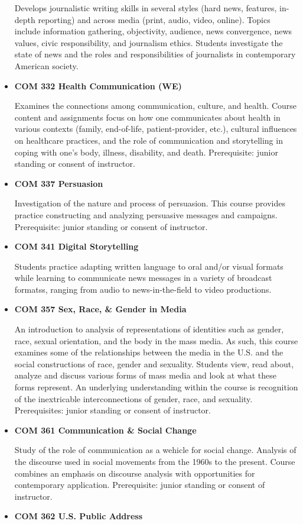 \documentclass[
  letterpaper,
]{scrbook}
\begin{document}
\begin{itemize}
  Develops journalistic writing skills in several styles (hard news,
  features, in-depth reporting) and across media (print, audio, video,
  online). Topics include information gathering, objectivity, audience,
  news convergence, news values, civic responsibility, and journalism
  ethics. Students investigate the state of news and the roles and
  responsibilities of journalists in contemporary American society.
\item
  \textbf{COM 332 Health Communication (WE)}

  Examines the connections among communication, culture, and health.
  Course content and assignments focus on how one communicates about
  health in various contexts (family, end-of-life, patient-provider,
  etc.), cultural influences on healthcare practices, and the role of
  communication and storytelling in coping with one's body, illness,
  disability, and death. Prerequisite: junior standing or consent of
  instructor.
\item
  \textbf{COM 337 Persuasion}

  Investigation of the nature and process of persuasion. This course
  provides practice constructing and analyzing persuasive messages and
  campaigns. Prerequisite: junior standing or consent of instructor.
\item
  \textbf{COM 341 Digital Storytelling}

  Students practice adapting written language to oral and/or visual
  formats while learning to communicate news messages in a variety of
  broadcast formatss, ranging from audio to news-in-the-field to video
  productions.
\item
  \textbf{COM 357 Sex, Race, \& Gender in Media}

  An introduction to analysis of representations of identities such as
  gender, race, sexual orientation, and the body in the mass media. As
  such, this course examines some of the relationships between the media
  in the U.S. and the social constructions of race, gender and
  sexuality. Students view, read about, analyze and discuss various
  forms of mass media and look at what these forms represent. An
  underlying understanding within the course is recognition of the
  inextricable interconnections of gender, race, and sexuality.
  Prerequisites: junior standing or consent of instructor.
\item
  \textbf{COM 361 Communication \& Social Change}

  Study of the role of communication as a wehicle for social change.
  Analysis of the discourse used in social movements from the 1960s to
  the present. Course combines an emphasis on discourse analysis with
  opportunities for contemporary application. Prerequisite: junior
  standing or consent of instructor.
\item
  \textbf{COM 362 U.S. Public Address}


\end{itemize}
\end{document}
